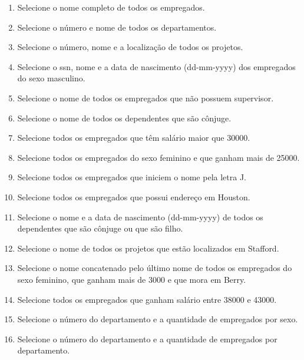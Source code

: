 \documentclass[11pt]{article}
\begin{document}
	\begin{enumerate}
		\item Selecione o nome completo de todos os empregados.
		
		\item Selecione o número e nome de todos os departamentos.
		
		\item Selecione o número, nome e a localização de todos os projetos.
				
		\item Selecione o ssn, nome e a data de nascimento (dd-mm-yyyy) dos empregados do sexo masculino.
		
		\item Selecione o nome de todos os empregados que não possuem supervisor.
		
		\item Selecione o nome de todos os dependentes que são cônjuge.
		
		\item Selecione todos os empregados que têm salário maior que 30000.
		
		\item Selecione todos os empregados do sexo feminino e que ganham mais de 25000.
		
		\item Selecione todos os empregados que iniciem o nome pela letra J.

		\item Selecione todos os empregados que possui endereço em Houston.
				
		\item Selecione o nome e a data de nascimento (dd-mm-yyyy) de todos os dependentes que são cônjuge ou que são filho.
		
		\item Selecione o nome de todos os projetos que estão localizados em Stafford.
		
		\item Selecione o nome concatenado pelo último nome de todos os empregados do sexo feminino, que ganham mais de 3000 e que mora em Berry.
		
		\item Selecione todos os empregados que ganham salário entre 38000 e 43000.
		
		\item Selecione o número do departamento e a quantidade de empregados por sexo.
		
		\item Selecione o número do departamento e a quantidade de empregados por departamento.
		

\end{enumerate}
\end{document}
